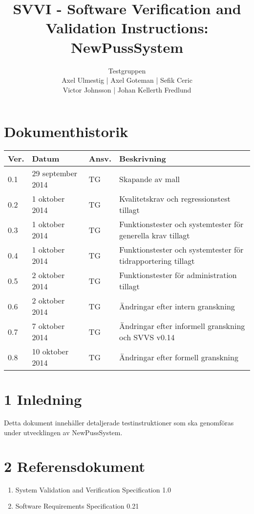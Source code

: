 \documentclass[a4paper]{article}
\title{SVVI - Software Verification and Validation Instructions: NewPussSystem}
\author{Testgruppen \\ Axel Ulmestig | Axel Goteman | Sefik Ceric \\ Victor Johnsson | Johan Kellerth Fredlund}
\date{}
\begin{document}
\maketitle
\thispagestyle{fancy}
\tableofcontents
\newpage

\section*{Dokumenthistorik}

\begin{tabular}{ l l l p{9cm} }
Ver. & Datum & Ansv. & Beskrivning \\\hline
0.1 & 29 september 2014 & TG & Skapande av mall \\
0.2 & 1 oktober 2014 & TG & Kvalitetskrav och regressionstest tillagt \\
0.3 & 1 oktober 2014 & TG & Funktionstester och systemtester för generella krav tillagt\\
0.4 & 1 oktober 2014 & TG & Funktionstester och systemtester för tidrapportering tillagt\\
0.5 & 2 oktober 2014 & TG & Funktionstester för administration tillagt\\
0.6 & 2 oktober 2014 & TG & Ändringar efter intern granskning\\
0.7 & 7 oktober 2014 & TG & Ändringar efter informell granskning och SVVS v0.14\\
0.8 & 10 oktober 2014 & TG & Ändringar efter formell granskning\\

\end{tabular}
\section{1 Inledning}       

Detta dokument innehåller detaljerade testinstruktioner som ska genomföras under utvecklingen av NewPussSystem.

\section{2 Referensdokument}
\begin{enumerate}
\item System Validation and Verification Specification 1.0
\item Software Requirements Specification 0.21
\end{enumerate}
\end{document}
